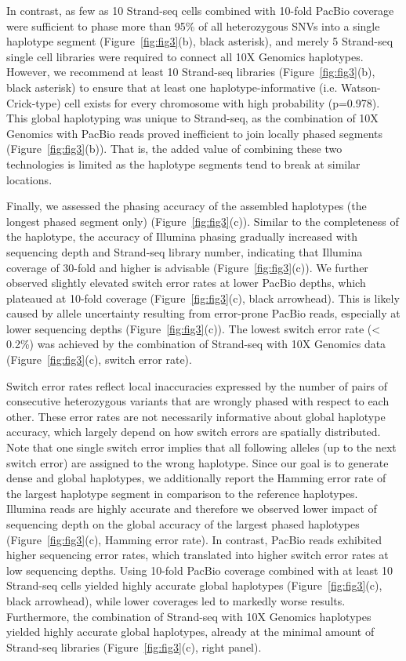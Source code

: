     In contrast, as few as 10 Strand-seq cells combined with 10-fold PacBio coverage were sufficient to phase more than 95\% of all heterozygous SNVs into a single haplotype segment (Figure~\ref{fig:fig3}(b), black asterisk), 
    and merely 5 Strand-seq single cell libraries were required to connect all 10X Genomics haplotypes. 
    However, we recommend at least 10 Strand-seq libraries (Figure~\ref{fig:fig3}(b), black asterisk) to ensure that at least one haplotype-informative (i.e. Watson-Crick-type) cell exists for every chromosome with high probability (p=0.978).
    This global haplotyping was unique to Strand-seq, as the combination of 10X Genomics with PacBio reads proved inefficient to join locally phased segments (Figure~\ref{fig:fig3}(b)). 
    That is, the added value of combining these two technologies is limited as the haplotype segments tend to break at similar locations.
    
    Finally, we assessed the phasing accuracy of the assembled haplotypes (the longest phased segment only) (Figure~\ref{fig:fig3}(c)). 
    Similar to the completeness of the haplotype, the accuracy of Illumina phasing gradually increased with sequencing depth and Strand-seq library number, indicating that Illumina coverage of 30-fold and higher is advisable (Figure~\ref{fig:fig3}(c)). 
    We further observed slightly elevated switch error rates at lower PacBio depths, which plateaued at 10-fold coverage (Figure~\ref{fig:fig3}(c), black arrowhead). 
    This is likely caused by allele uncertainty resulting from error-prone PacBio reads, especially at lower sequencing depths (Figure~\ref{fig:fig3}(c)). 
    The lowest switch error rate (< 0.2\%) was achieved by the combination of Strand-seq with 10X Genomics data (Figure~\ref{fig:fig3}(c), switch error rate).

    Switch error rates reflect local inaccuracies expressed by the number of pairs of consecutive heterozygous variants that are wrongly phased with respect to each other. 
    These error rates are not necessarily informative about global haplotype accuracy, which largely depend on how switch errors are spatially distributed. 
    Note that one single switch error implies that all following alleles (up to the next switch error) are assigned to the wrong haplotype. 
    Since our goal is to generate dense and global haplotypes, we additionally report the Hamming error rate of the largest haplotype segment in comparison to the reference haplotypes. 
    Illumina reads are highly accurate and therefore we observed lower impact of sequencing depth on the global accuracy of the largest phased haplotypes (Figure~\ref{fig:fig3}(c), Hamming error rate). 
    In contrast, PacBio reads exhibited higher sequencing error rates, which translated into higher switch error rates at low sequencing depths. 
    Using 10-fold PacBio coverage combined with at least 10 Strand-seq cells yielded highly accurate global haplotypes (Figure~\ref{fig:fig3}(c), black arrowhead), 
    while lower coverages led to markedly worse results. Furthermore, the combination of Strand-seq with 10X Genomics haplotypes yielded highly accurate global haplotypes, 
    already at the minimal amount of Strand-seq libraries (Figure~\ref{fig:fig3}(c), right panel).
    
